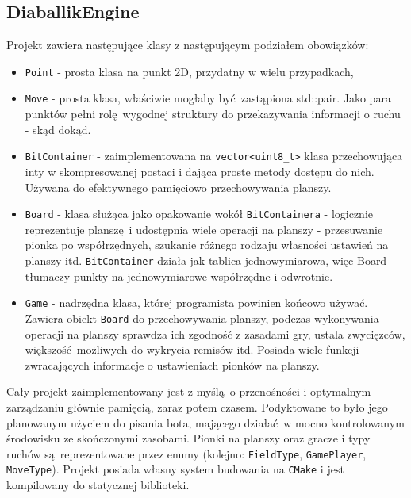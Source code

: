 \documentclass[a4paper,12pt]{article}
\begin{document}
\subsection{DiaballikEngine}
Projekt zawiera następujące klasy z następującym podziałem obowiązków:
\begin{itemize}
 \item \verb|Point| - prosta klasa na punkt 2D, przydatny w wielu przypadkach,
 \item \verb|Move| - prosta klasa, właściwie mogłaby być zastąpiona std::pair. Jako para punktów pełni rolę wygodnej struktury do przekazywania informacji
 o ruchu - skąd dokąd.
 \item \verb|BitContainer| - zaimplementowana na \verb|vector<uint8_t>| klasa przechowująca inty w skompresowanej postaci i dająca proste metody dostępu do nich.
 Używana do efektywnego pamięciowo przechowywania planszy.
 \item \verb|Board| - klasa służąca jako opakowanie wokół \verb|BitContainera| - logicznie reprezentuje planszę i udostępnia wiele operacji na planszy - 
 przesuwanie pionka po współrzędnych, szukanie różnego rodzaju własności ustawień na planszy itd. \verb|BitContainer| działa jak tablica jednowymiarowa, więc
 Board tłumaczy punkty na jednowymiarowe współrzędne i odwrotnie.
 \item \verb|Game| - nadrzędna klasa, której programista powinien końcowo używać. Zawiera obiekt \verb|Board| do przechowywania planszy, podczas 
 wykonywania operacji na planszy sprawdza ich zgodność z zasadami gry, ustala zwycięzców, większość możliwych do wykrycia remisów itd. Posiada wiele funkcji
 zwracających informacje o ustawieniach pionków na planszy.
\end{itemize}
Cały projekt zaimplementowany jest z myślą o przenośności i optymalnym zarządzaniu głównie pamięcią, zaraz potem czasem. Podyktowane to było jego
planowanym użyciem do pisania bota, mającego działać w mocno kontrolowanym środowisku ze skończonymi zasobami.
Pionki na planszy oraz gracze i typy ruchów są reprezentowane przez enumy (kolejno: \verb|FieldType|, \verb|GamePlayer|, \verb|MoveType|).
Projekt posiada własny system budowania na \verb|CMake| i jest kompilowany do statycznej biblioteki.
\end{document}
